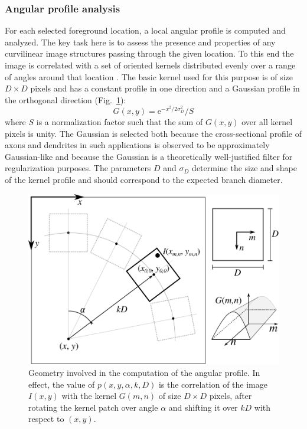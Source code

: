 \subsubsection{Angular profile analysis}
\label{ch2:subsubsec:angular-profile}
For each selected foreground location, a local angular profile is computed and analyzed. The key task here is to assess the presence and properties of any curvilinear image structures passing through the given location. To this end the image is correlated with a set of oriented kernels distributed evenly over a range of angles around that location \cite{radojevic2014fuzzy}. The basic kernel used for this purpose is of size $D\times D$ pixels and has a constant profile in one direction and a Gaussian profile in the orthogonal direction (Fig.~\ref{ch2_fig3}):
\begin{equation}
G(x,y)=\textrm{e}^{-x^2/2\sigma_{\!\!D}^{2}}/S
\label{eq:G}
\end{equation}
where $S$ is a normalization factor such that the sum of $G(x,y)$ over all kernel pixels is unity. The Gaussian is selected both because the cross-sectional profile of axons and dendrites in such applications is observed to be approximately Gaussian-like and because the Gaussian is a theoretically well-justified filter for regularization purposes. The parameters $D$ and $\sigma_{\!D}$ determine the size and shape of the kernel profile and should correspond to the expected branch diameter.

\begin{figure}[!t]
	\centering
	\includegraphics[width=0.5\columnwidth]{fig3}
	\caption{Geometry involved in the computation of the angular profile. In effect, the value of $p(x,y,\alpha,k,D)$ is the correlation of the image $I(x,y)$ with the kernel $G(m,n)$ of size $D\times D$ pixels, after rotating the kernel patch over angle $\alpha$ and shifting it over $kD$ with respect to $(x,y)$.}
	\label{ch2_fig3}
\end{figure}

